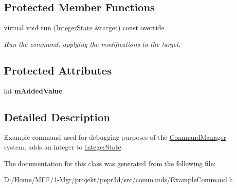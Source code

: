 \subsection*{Protected Member Functions}
\begin{DoxyCompactItemize}
\item 
\mbox{\label{classpepr3d_1_1_add_value_command_a0663c6c8ac659393304a13c1f9089865}} 
virtual void \mbox{\hyperlink{classpepr3d_1_1_add_value_command_a0663c6c8ac659393304a13c1f9089865}{run}} (\mbox{\hyperlink{structpepr3d_1_1_integer_state}{Integer\+State}} \&target) const override
\begin{DoxyCompactList}\small\item\em Run the command, applying the modifications to the target. \end{DoxyCompactList}\end{DoxyCompactItemize}
\subsection*{Protected Attributes}
\begin{DoxyCompactItemize}
\item 
\mbox{\label{classpepr3d_1_1_add_value_command_a337304dc83c224cfc9c28d735bff883b}} 
int {\bfseries m\+Added\+Value}
\end{DoxyCompactItemize}


\subsection{Detailed Description}
Example command used for debugging purposes of the \mbox{\hyperlink{classpepr3d_1_1_command_manager}{Command\+Manager}} system, adds an integer to \mbox{\hyperlink{structpepr3d_1_1_integer_state}{Integer\+State}}. 

The documentation for this class was generated from the following file\+:\begin{DoxyCompactItemize}
\item 
D\+:/\+Home/\+M\+F\+F/1-\/\+Mgr/projekt/pepr3d/src/commands/Example\+Command.\+h\end{DoxyCompactItemize}
